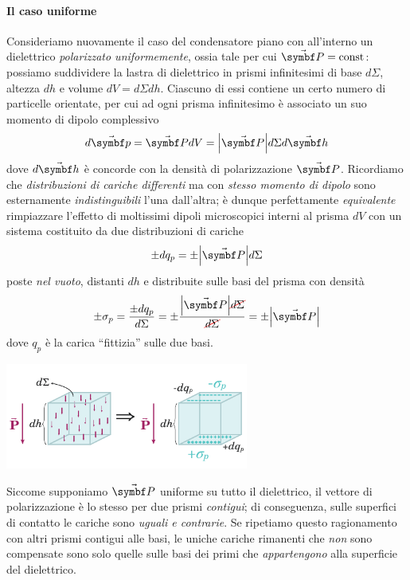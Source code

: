\paragraph{Il caso uniforme}
Consideriamo nuovamente il caso del condensatore piano con all'interno un dielettrico \textit{polarizzato uniformemente}, ossia tale per cui $\vba{P}=\text{const}$: possiamo suddividere la lastra di dielettrico in prismi infinitesimi di base $d\Sigma$, altezza $dh$ e volume $dV=d\Sigma dh$. Ciascuno di essi contiene un certo numero di particelle orientate, per cui ad ogni prisma infinitesimo è associato un suo momento di dipolo complessivo
\begin{equation*}
	d\vba{p}=\vba{P}dV=\abs{\vba{P}}d\Sigma d\vba{h}
\end{equation*}
dove $d\vba{h}$ è concorde con la densità di polarizzazione $\vba{P}$. Ricordiamo che \textit{distribuzioni di cariche differenti} ma con \textit{stesso momento di dipolo} sono esternamente \textit{indistinguibili} l'una dall'altra; è dunque perfettamente \textit{equivalente} rimpiazzare l'effetto di moltissimi dipoli microscopici interni al prisma $dV$ con un sistema costituito da due distribuzioni di cariche
\begin{equation*}
	\pm dq_p=\pm \abs{\vba{P}}d\Sigma
\end{equation*}
poste \textit{nel vuoto}, distanti $dh$ e distribuite sulle basi del prisma con densità
\begin{equation*}
	\pm\sigma_p=\frac{\pm dq_p}{d\Sigma}=\pm\frac{\abs{\vba{P}}\Ccancel[red]{d\Sigma}}{\Ccancel[red]{d\Sigma}}=\pm\abs{\vba{P}}
\end{equation*}
dove $q_p$ è la carica ``fittizia'' sulle due basi.
\begin{center}
	\includegraphics[width=0.6\textwidth]{images/chp6/chp6caricapolari1.pdf}
\end{center}
Siccome supponiamo $\vba{P}$ uniforme su tutto il dielettrico, il vettore di polarizzazione è lo stesso per due prismi \textit{contigui}; di conseguenza, sulle superfici di contatto le cariche sono \textit{uguali e contrarie}. Se ripetiamo questo ragionamento con altri prismi contigui alle basi, le uniche cariche rimanenti che \textit{non} sono compensate sono solo quelle sulle basi dei primi che \textit{appartengono} alla superficie del dielettrico.
